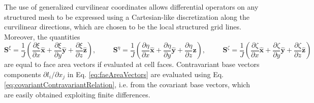 \documentclass[journal abbreviation, manuscript]{copernicus}
\begin{document}
The use of generalized curvilinear coordinates allows differential operators on any structured mesh to be expressed using a Cartesian-like discretization along the curvilinear directions, which are chosen to be the local structured grid lines. Moreover, the quantities
\begin{equation}
	\mathbf{S}^{\xi} = \frac{1}{J}\left(\frac{\partial \xi}{\partial x}\widehat{\mathbf{x}}+\frac{\partial \xi}{\partial y}\widehat{\mathbf{y}}+\frac{\partial \xi}{\partial z}\widehat{\mathbf{z}}\right), \hspace{1cm} \mathbf{S}^{\eta} = \frac{1}{J}\left(\frac{\partial \eta}{\partial x}\widehat{\mathbf{x}}+\frac{\partial \eta}{\partial y}\widehat{\mathbf{y}}+\frac{\partial \eta}{\partial z}\widehat{\mathbf{z}}\right), \hspace{1cm}\mathbf{S}^{\zeta} = \frac{1}{J}\left(\frac{\partial \zeta}{\partial x}\widehat{\mathbf{x}}+\frac{\partial \zeta}{\partial y}\widehat{\mathbf{y}}+\frac{\partial \zeta}{\partial z}\widehat{\mathbf{z}}\right) \label{eq:faeAreaVectors}
\end{equation}
are equal to face area vectors if evaluated at cell faces. Contravariant base vectors components $\partial l_i/\partial x_j$ in Eq. \ref{eq:faeAreaVectors} are evaluated using Eq. \ref{eq:covariantContravariantRelation}, i.e. from the covariant base vectors, which are easily obtained exploiting finite differences. 
\end{document}
